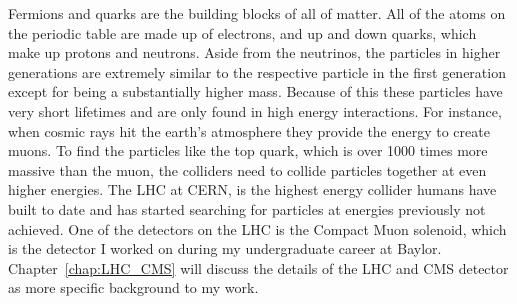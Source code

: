Fermions and quarks are the building blocks of all of matter. All of the atoms on the periodic table are made up of electrons, and up and down quarks, which make up protons and neutrons. Aside from the neutrinos, the particles in higher generations are extremely similar to the respective particle in the first generation except for being a substantially higher mass. Because of this these particles have very short lifetimes and are only found in high energy interactions. For instance, when cosmic rays hit the earth's atmosphere they provide the energy to create muons. To find the particles like the top quark, which is over 1000 times more massive than the muon, the colliders need to collide particles together at even higher energies. The LHC at CERN, is the highest energy collider humans have built to date and has started searching for particles at energies previously not achieved. One of the detectors on the LHC is the Compact Muon solenoid, which is the detector I worked on during my undergraduate career at Baylor. Chapter~\ref{chap:LHC_CMS} will discuss the details of the LHC and CMS detector as more specific background to my work. 